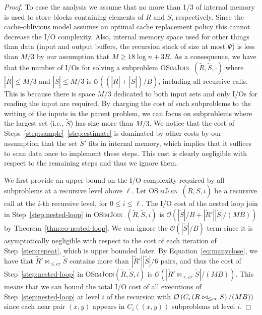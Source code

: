 \documentclass{llncs}
\newcommand{\Osymbol}{{\mathcal O}}
\newcommand{\BO}[1]{\Osymbol\left(#1\right)}
\newcommand{\SimJoin}{\textsc{OSimJoin}}
\begin{document}
\begin{proof} 



To ease the analysis we assume that no more than 1/3 of internal memory is used to store blocks containing elements of $R$ and $S$, respectively. 
Since the cache-oblivious model assumes an optimal cache replacement policy this cannot decrease the I/O complexity. 
Also, internal memory space used for other things than data (input and output buffers, the recursion stack of size at most $\Psi$) is less than $M/3$ by our assumption that $M\geq 18\log n+3B$. 
As a consequence, we have that the number of I/Os for solving a subproblem \SimJoin\ $(\tilde{R},\tilde{S}, \cdot)$ where $|\tilde{R}|\leq
M/3$ and $|\tilde S|\leq M/3$ is $\BO{(|\tilde{R}|+|\tilde{S}|)/B}$, including all recursive calls. 
This is because there is space $M/3$ dedicated to both input sets and only I/Os for reading the input are required. 
By charging the cost of such subproblems to the writing of the inputs in the parent problem, we can focus on subproblems where the largest set (i.e., $\tilde{S}$) has size more than $M/3$.
We notice that the cost of Steps~\ref{step:sample}--\ref{step:estimate} is dominated by other costs by our assumption that the set $\tilde S'$ fits in internal memory, which implies that it suffices to scan data once to implement these steps. 
This cost is clearly negligible with respect to the remaining steps and thus we ignore them.

We first provide an upper bound on the I/O complexity required  by all subproblems at a recursive level above $\ell$. 
Let \SimJoin\ $(\tilde{R},\tilde{S},i)$ be a recursive call at the $i$-th recursive level, for $0 \leq i \leq \ell$. 
The I/O cost of the nested loop join in Step~\ref{step:nested-loop} in \SimJoin\ $(\tilde{R},\tilde{S},i)$ is $\BO{|\tilde{S}|/B + |\tilde{R}'| |\tilde{S}| / (MB)}$ by Theorem~\ref{thm:co-nested-loop}. 
We can ignore the $\BO{|\tilde{S}|/B}$ term since it is asymptotically negligible with respect to the cost of each iteration of Step~\ref{step:repeat}, which is upper bounded later. 
By Equation~\ref{eq:manyclose}, we have that $\tilde{R}' \bowtie_{\leq cr} \tilde{S}$ contains more than
$|\tilde{R}'| |\tilde{S}|/6$ pairs, and thus the cost of Step~\ref{step:nested-loop} in \SimJoin$(\tilde{R},\tilde{S},i)$ is $\BO{|\tilde
R'\bowtie_{\leq cr} \tilde S|/(MB)}$. 
This means that we can bound the total I/O cost of all executions of Step~\ref{step:nested-loop} at level $i$ of the recursion with $\BO{\C{R \bowtie_{\leq cr} S}/(MB)}$ since each near pair $(x,y)$ appears in $C_i((x,y))$  subproblems at level $i$.


\end{proof}
\end{document}
